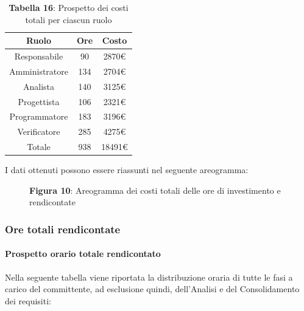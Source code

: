 \begin{table}[H]
	\centering
	\renewcommand{\arraystretch}{1.5}
	\begin{tabular}{|c|c|c|}
		\hline
		\rowcolor{lighter-grayer}
		Ruolo & Ore & Costo \\
		\hline
		Responsabile & 90 & 2870\euro \\
		\hline
		Amministratore & 134 & 2704\euro \\
		\hline
		Analista & 140 & 3125\euro \\
		\hline
		Progettista& 106 & 2321\euro \\
		\hline
		Programmatore & 183 & 3196\euro \\
		\hline
		Verificatore & 285 & 4275\euro \\
		\hline
		Totale & 938 &  18491\euro \\
		\hline
	\end{tabular}
	\caption*{\textbf{Tabella 16}: Prospetto dei costi totali per ciascun ruolo \\}
\end{table}

I dati ottenuti possono essere riassunti nel seguente areogramma:


\begin{figure}[H]
	\centering
	\caption*{\textbf{Figura 10}: Areogramma dei costi totali delle ore di investimento e rendicontate}
    \label{fig:Figura10}
\end{figure}

\subsubsection{Ore totali rendicontate}
\paragraph{Prospetto orario totale rendicontato}
Nella seguente tabella viene riportata la distribuzione oraria di tutte le fasi a carico del committente, ad esclusione quindi, dell'Analisi e del Consolidamento dei requisiti:

